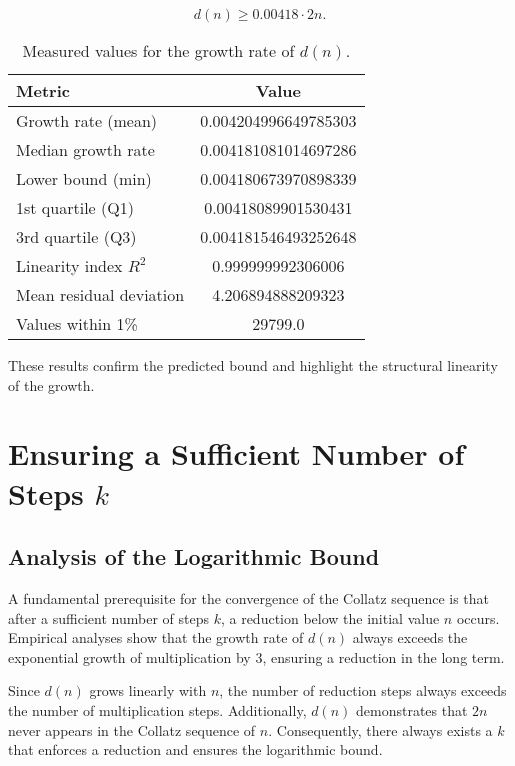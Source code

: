 \documentclass[a4paper,12pt]{article}
\begin{document}
\begin{equation}
    d(n) \geq 0.00418 \cdot 2n.
\end{equation}

\begin{table}[h]
    \centering
    \begin{tabular}{|l|c|}
        \hline
        \textbf{Metric} & \textbf{Value} \\
        \hline
        Growth rate (mean) & 0.004204996649785303 \\
        Median growth rate & 0.004181081014697286 \\
        Lower bound (min) & 0.004180673970898339 \\
        1st quartile (Q1) & 0.00418089901530431 \\
        3rd quartile (Q3) & 0.004181546493252648 \\
        Linearity index \( R^2 \) & 0.999999992306006 \\
        Mean residual deviation & 4.206894888209323 \\
        Values within 1\% & 29799.0 \\
        \hline
    \end{tabular}
    \caption{Measured values for the growth rate of \( d(n) \).}
\end{table}

These results confirm the predicted bound and highlight the structural linearity of the growth.



\section{Ensuring a Sufficient Number of Steps \( k \)}

\subsection{Analysis of the Logarithmic Bound}

A fundamental prerequisite for the convergence of the Collatz sequence is that after a sufficient number of steps \( k \), a reduction below the initial value \( n \) occurs. Empirical analyses show that the growth rate of \( d(n) \) always exceeds the exponential growth of multiplication by 3, ensuring a reduction in the long term.

Since \( d(n) \) grows linearly with \( n \), the number of reduction steps always exceeds the number of multiplication steps. Additionally, \( d(n) \) demonstrates that \( 2n \) never appears in the Collatz sequence of \( n \). Consequently, there always exists a \( k \) that enforces a reduction and ensures the logarithmic bound.
\end{document}
